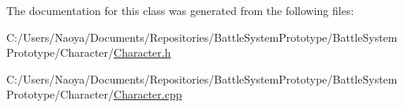 The documentation for this class was generated from the following files\+:\begin{DoxyCompactItemize}
\item 
C\+:/\+Users/\+Naoya/\+Documents/\+Repositories/\+Battle\+System\+Prototype/\+Battle\+System\+Prototype/\+Character/\hyperlink{_character_8h}{Character.\+h}\item 
C\+:/\+Users/\+Naoya/\+Documents/\+Repositories/\+Battle\+System\+Prototype/\+Battle\+System\+Prototype/\+Character/\hyperlink{_character_8cpp}{Character.\+cpp}\end{DoxyCompactItemize}
